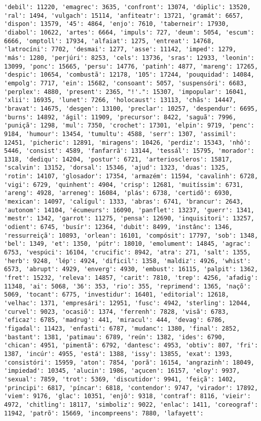 \documentclass[11pt]{article}
\begin{document}
\begin{Verbatim}[commandchars=\\\{\}]
'debil': 11220, 'emagrec': 3635, 'confront': 13074, 'dúplic': 13520, 'ral': 1494, 'vulgach': 15114, 'anfiteatr': 13721, 'gramát': 6657, 'dispon': 13579, '45': 4864, 'enjo': 7610, 'taberneir': 17930, 'diabol': 10622, 'artes': 6664, 'impuls': 727, 'deum': 5054, 'escum': 6666, 'omptoll': 17934, 'alfaiat': 1275, 'entreat': 14768, 'latrocíni': 7702, 'desmai': 1277, 'asse': 11142, 'imped': 1279, 'más': 1280, 'perjúri': 8253, 'cels': 13736, 'sras': 12933, 'leonin': 13099, 'ponc': 15665, 'persu': 14776, 'patinh': 4877, 'mareng': 17265, 'despic': 10654, 'combustã': 12178, '105': 17244, 'pouquidad': 14084, 'empolg': 7717, 'ein': 15682, 'consoant': 5057, 'suspensóri': 6683, 'perplex': 4880, 'present': 2365, "!'.": 15307, 'impopular': 16041, 'xlii': 16935, 'lunet': 7266, 'holocaust': 13113, 'chãs': 14447, 'bravat': 14675, 'desgen': 13100, 'preclar': 10257, 'despendur': 6695, 'burns': 14892, 'ágil': 11909, 'precursor': 8422, 'saguã': 7996, 'puniçã': 1298, 'mul': 7350, 'crochet': 17301, 'elpin': 9719, 'penc': 9184, 'humour': 13454, 'tumultu': 4588, 'serr': 1307, 'assimil': 12451, 'picheric': 12891, 'miragens': 10426, 'perdiz': 15343, 'nhô': 5446, 'consist': 4589, 'fanfarrã': 13144, 'tessál': 15795, 'morador': 1318, 'dediqu': 14204, 'postur': 6721, 'arterioscleros': 15817, 'scalvin': 13152, 'dorsal': 15346, 'ajud': 1323, 'duas': 1325, 'rotin': 14107, 'glosador': 17354, 'armazém': 11594, 'cavalinh': 6728, 'vigi': 6729, 'quinhent': 4904, 'crisp': 12681, 'muitíssim': 6731, 'areng': 4928, 'arreneg': 16084, 'plás': 6738, 'certidõ': 6930, 'mexican': 14097, 'calígul': 1333, 'abras': 6741, 'brancur': 2643, 'autonom': 14104, 'écumeurs': 16090, 'panflet': 13237, 'guerr': 1341, 'mestr': 1342, 'garrot': 11275, 'pensa': 12690, 'inquisitori': 13257, 'odient': 6745, 'busír': 12364, 'dubit': 8499, 'instânc': 1346, 'ressurreiçã': 10893, 'orlean': 16101, 'compósit': 17797, 'sob': 1348, 'bel': 1349, 'et': 1350, 'pútr': 18010, 'emolument': 14845, 'agrac': 6753, 'vespúci': 16104, 'crucific': 8942, 'atra': 271, 'salt': 1355, 'herb': 9248, 'lép': 4924, 'dificil': 1358, 'maldiz': 4926, 'whist': 6573, 'abrupt': 4929, 'enverg': 4930, 'embust': 16115, 'palpit': 1362, 'fret': 15232, 'releva': 14857, 'carit': 7810, 'trep': 4256, 'afadig': 11348, 'ai': 5068, '36': 353, 'rio': 355, 'reprimend': 1365, 'naçõ': 5069, 'tocant': 6775, 'investidur': 16401, 'editorial': 12618, 'velhac': 1371, 'empresári': 12951, 'fusc': 4942, 'sterling': 12044, 'curvel': 9023, 'ocasiõ': 1374, 'ferrenh': 7828, 'visã': 6783, 'eficaz': 6785, 'madrug': 441, 'miracul': 444, 'devag': 6786, 'figadal': 11423, 'enfasti': 6787, 'mudanc': 1380, 'final': 2852, 'bastant': 1381, 'patimau': 6789, 'reún': 1382, 'ides': 6790, 'chican': 4951, 'pimentã': 6792, 'dantesc': 4953, 'obtiv': 807, 'fri': 1387, 'incúr': 4955, 'está': 1388, 'issy': 13855, 'exat': 1393, 'consistóri': 15959, 'aton': 7854, 'porã': 16154, 'angrazinh': 18049, 'impiedad': 10345, 'alucin': 1986, 'açucen': 16157, 'eloy': 9937, 'sexual': 7859, 'trot': 5369, 'discutidor': 9941, 'feiçã': 1402, 'principi': 6817, 'píncar': 6818, 'contendor': 9747, 'virador': 17892, 'viem': 9176, 'glac': 10351, 'enjô': 9318, 'contraf': 8116, 'vieir': 4972, 'chitling': 18117, 'simboliz': 9022, 'enlac': 1411, 'coreograf': 11942, 'patrõ': 15669, 'incompreens': 7880, 'lafayett': 
\end{Verbatim}
\end{document}
